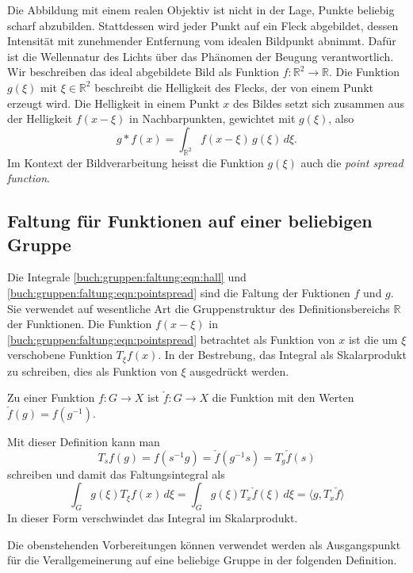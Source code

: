 Die Abbildung mit einem realen Objektiv ist nicht in der Lage,
Punkte beliebig scharf abzubilden.
Stattdessen wird jeder Punkt auf ein Fleck abgebildet, dessen Intensität
mit zunehmender Entfernung vom idealen Bildpunkt abnimmt.
Dafür ist die Wellennatur des Lichts über das Phänomen der Beugung
verantwortlich.
Wir beschreiben das ideal abgebildete Bild als Funktion
$f\colon\mathbb{R}^2\to\mathbb{R}$.
Die Funktion $g(\xi)$ mit $\xi\in\mathbb{R}^2$ beschreibt die
Helligkeit des Flecks, der von einem Punkt erzeugt wird.
Die Helligkeit in einem Punkt $x$ des Bildes setzt sich zusammen
aus der Helligkeit $f(x-\xi)$ in Nachbarpunkten, gewichtet mit
$g(\xi)$, also
\begin{equation}
g*f(x)
=
\int_{\mathbb{R}^2} f(x-\xi)\,g(\xi)\,d\xi.
\label{buch:gruppen:faltung:eqn:pointspread}
\end{equation}
Im Kontext der Bildverarbeitung heisst
die Funktion $g(\xi)$ auch die {\em point spread function}.

%
%
\subsection{Faltung für Funktionen auf einer beliebigen Gruppe}
Die Integrale \eqref{buch:gruppen:faltung:eqn:hall} und
\eqref{buch:gruppen:faltung:eqn:pointspread} sind die Faltung
der Fuktionen $f$ und $g$.
Sie verwendet auf wesentliche Art die Gruppenstruktur des
Definitionsbereichs $\mathbb{R}$ der Funktionen.
Die Funktion $f(x-\xi)$ in \eqref{buch:gruppen:faltung:eqn:pointspread}
betrachtet als Funktion von $x$ ist die um $\xi$ verschobene
Funktion $T_\xi f(x)$.
In der Bestrebung, das Integral als Skalarprodukt zu schreiben,
dies als Funktion von $\xi$ ausgedrückt werden.

\begin{definition}
Zu einer Funktion $f\colon G\to X$ ist $\check{f}\colon G\to X$ die
Funktion mit den Werten $\check{f}(g) = f(g^{-1})$.
\end{definition}

Mit dieser Definition kann man
\[
T_s f(g)
=
f(s^{-1}g)
=
\check{f}(g^{-1}s)
=
T_g\check{f}(s)
\]
schreiben und damit das Faltungsintegral als
\[
\int_G g(\xi) T_\xi f(x)\,d\xi
=
\int_G g(\xi) T_x \check{f}(\xi)\,d\xi
=
\langle g, T_x\check{f}\rangle
\]
In dieser Form verschwindet das Integral im Skalarprodukt.

Die obenstehenden Vorbereitungen können verwendet werden als
Ausgangspunkt für die Verallgemeinerung auf eine beliebige Gruppe
in der folgenden Definition.

